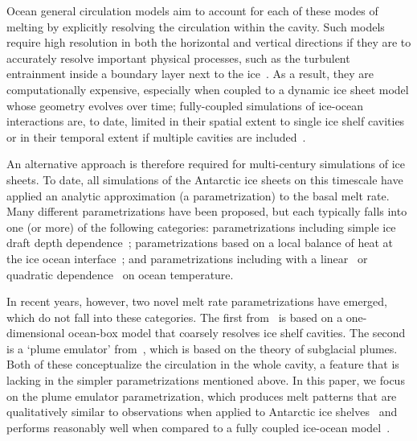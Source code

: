 \documentclass[openacc]{rsproca_new}%
\begin{document}
Ocean general circulation models aim to account for each of these modes of melting by explicitly resolving the circulation within the cavity. Such models require high resolution in both the horizontal and vertical directions if they are to accurately resolve important physical processes, such as the turbulent entrainment inside a boundary layer next to the ice~\citep[e.g.][]{Kimura2014JPhysOcean}. As a result, they are computationally expensive, especially when coupled to a dynamic ice sheet model whose geometry evolves over time; fully-coupled simulations of ice-ocean interactions are, to date, limited in their spatial extent to single ice shelf cavities~\citep[e.g.][]{DeRydt2016JGeophysResEarthSurf, Seroussi2017GRL} or in their temporal extent if multiple cavities are included~\citep[e.g.][]{Naughten2018JClim}.

An alternative approach is therefore required for multi-century simulations of ice sheets. To date, all simulations of the Antarctic ice sheets on this timescale have applied an analytic approximation (a parametrization) to the basal melt rate. Many different parametrizations have been proposed, but each typically falls into one (or more) of the following categories: parametrizations including simple ice draft depth dependence~\citep[e.g.][]{Joughin2014Science}; parametrizations based on a local balance of heat at the ice ocean interface~\citep[e.g][]{Golledge2015Nature}; and parametrizations including with a linear~\citep[e.g.][]{Favier2016Cryo} or quadratic dependence~\citep[e.g.][]{Holland2008JClimate,DeConto2016Nature} on ocean temperature.

In recent years, however, two novel melt rate parametrizations have emerged, which do not fall into these categories. The first from~\citet{Reese2018Cryo} is based on a one-dimensional ocean-box model that coarsely resolves ice shelf cavities. The second is a `plume emulator' from~\citet{Lazeroms2018TheCryo}, which is based on the theory of subglacial plumes. Both of these conceptualize the circulation in the whole cavity, a feature that is lacking in the simpler parametrizations mentioned above. In this paper, we focus on the plume emulator parametrization, which produces melt patterns that are qualitatively similar to observations when applied to Antarctic ice shelves~\citep{Lazeroms2018TheCryo} and performs reasonably well when compared to a fully coupled ice-ocean model~\citep{Favier2019GeosciModDev}.
\end{document}
